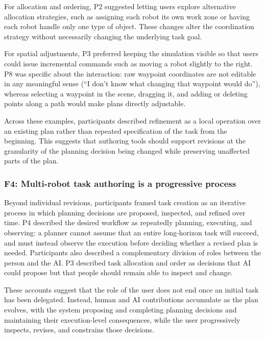 For allocation and ordering, P2 suggested letting users explore alternative allocation strategies, such as assigning each robot its own work zone or having each robot handle only one type of object.
These changes alter the coordination strategy without necessarily changing the underlying task goal.

For spatial adjustments, P3 preferred keeping the simulation visible so that users could issue incremental commands such as moving a robot slightly to the right.
P8 was specific about the interaction: raw waypoint coordinates are not editable in any meaningful sense (``I don't know what changing that waypoint would do''), whereas selecting a waypoint in the scene, dragging it, and adding or deleting points along a path would make plans directly adjustable.

Across these examples, participants described refinement as a local operation over an existing plan rather than repeated specification of the task from the beginning.
This suggests that authoring tools should support revisions at the granularity of the planning decision being changed while preserving unaffected parts of the plan.


\subsubsection{F4: Multi-robot task authoring is a progressive process}

Beyond individual revisions, participants framed task creation as an iterative process in which planning decisions are proposed, inspected, and refined over time.
P4 described the desired workflow as repeatedly planning, executing, and observing: a planner cannot assume that an entire long-horizon task will succeed, and must instead observe the execution before deciding whether a revised plan is needed.
Participants also described a complementary division of roles between the person and the AI.
P3 described task allocation and order as decisions that AI could propose but that people should remain able to inspect and change.

These accounts suggest that the role of the user does not end once an initial task has been delegated.
Instead, human and AI contributions accumulate as the plan evolves, with the system proposing and completing planning decisions and maintaining their execution-level consequences, while the user progressively inspects, revises, and constrains those decisions.


